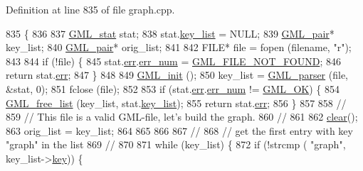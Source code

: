 Definition at line 835 of file graph.\+cpp.


\begin{DoxyCode}
835                                                               \{
836 
837     \mbox{\hyperlink{struct_g_m_l__stat}{GML\_stat}} stat;
838     stat.\mbox{\hyperlink{struct_g_m_l__stat_a3c6317b5ad431531fea5a16bc64490dd}{key\_list}} = NULL;
839     \mbox{\hyperlink{struct_g_m_l__pair}{GML\_pair}}* key\_list;
840     \mbox{\hyperlink{struct_g_m_l__pair}{GML\_pair}}* orig\_list;
841     
842     FILE* file = fopen (filename, \textcolor{stringliteral}{"r"});
843     
844     \textcolor{keywordflow}{if} (!file) \{
845     stat.\mbox{\hyperlink{struct_g_m_l__stat_afa0e8f9827fda2e60f3a5c7965a464b2}{err}}.\mbox{\hyperlink{struct_g_m_l__error_a66fe2c5a3d2d40e77ff486007dfe7f76}{err\_num}} = \mbox{\hyperlink{gml__scanner_8h_aabc90afcb30e75bca3bd9969ce74790ca6e236398ad4be2c96f938e0f2329c7ca}{GML\_FILE\_NOT\_FOUND}};
846     \textcolor{keywordflow}{return} stat.\mbox{\hyperlink{struct_g_m_l__stat_afa0e8f9827fda2e60f3a5c7965a464b2}{err}};
847     \} 
848 
849     \mbox{\hyperlink{gml__scanner_8h_af3b444abb87b2d5e5c65e3cca251ddc4}{GML\_init}} ();
850     key\_list = \mbox{\hyperlink{gml__parser_8h_aa3f23a53537ebaea18a899b1e683a9df}{GML\_parser}} (file, &stat, 0);
851     fclose (file);
852 
853     \textcolor{keywordflow}{if} (stat.\mbox{\hyperlink{struct_g_m_l__stat_afa0e8f9827fda2e60f3a5c7965a464b2}{err}}.\mbox{\hyperlink{struct_g_m_l__error_a66fe2c5a3d2d40e77ff486007dfe7f76}{err\_num}} != \mbox{\hyperlink{gml__scanner_8h_aabc90afcb30e75bca3bd9969ce74790ca724a94ac9d394a24aa1f80fb602ecaf2}{GML\_OK}}) \{
854     \mbox{\hyperlink{gml__parser_8h_ac8ee95de418abf6947ec597d235f0db2}{GML\_free\_list}} (key\_list, stat.\mbox{\hyperlink{struct_g_m_l__stat_a3c6317b5ad431531fea5a16bc64490dd}{key\_list}});
855     \textcolor{keywordflow}{return} stat.\mbox{\hyperlink{struct_g_m_l__stat_afa0e8f9827fda2e60f3a5c7965a464b2}{err}};
856     \}
857     
858     \textcolor{comment}{//}
859     \textcolor{comment}{// This file is a valid GML-file, let's build the graph.}
860     \textcolor{comment}{// }
861 
862     \mbox{\hyperlink{classgraph_a9ff5d6af3653e79f87b836701453f55a}{clear}}();
863     orig\_list = key\_list;
864 
865     
866 
867     \textcolor{comment}{//}
868     \textcolor{comment}{// get the first entry with key "graph" in the list}
869     \textcolor{comment}{// }
870 
871     \textcolor{keywordflow}{while} (key\_list) \{
872     \textcolor{keywordflow}{if} (!strcmp ( \textcolor{stringliteral}{"graph"}, key\_list->\mbox{\hyperlink{struct_g_m_l__pair_a00e5de36c09fef63b8d439b4341f0655}{key}})) \{

\end{DoxyCode}

